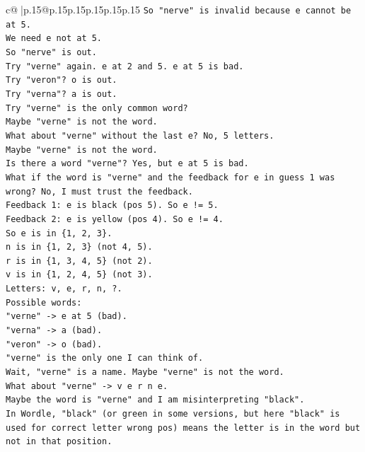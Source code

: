 \documentclass{article}
\begin{document}
{\begin{supertabular}{c@{$\;$}|p{.15\linewidth}@{}p{.15\linewidth}p{.15\linewidth}p{.15\linewidth}p{.15\linewidth}p{.15\linewidth}}
{{{\texttt{So "nerve" is invalid because e cannot be at 5.} \\
\texttt{We need e not at 5.} \\
\texttt{So "nerve" is out.} \\
\texttt{Try "verne" again. e at 2 and 5. e at 5 is bad.} \\
\texttt{Try "veron"? o is out.} \\
\texttt{Try "verna"? a is out.} \\
\texttt{Try "verne" is the only common word?} \\
\texttt{Maybe "verne" is not the word.} \\
\texttt{What about "verne" without the last e? No, 5 letters.} \\
\texttt{Maybe "verne" is not the word.} \\
\texttt{Is there a word "verne"? Yes, but e at 5 is bad.} \\
\texttt{What if the word is "verne" and the feedback for e in guess 1 was wrong? No, I must trust the feedback.} \\
\texttt{Feedback 1: e is black (pos 5). So e != 5.} \\
\texttt{Feedback 2: e is yellow (pos 4). So e != 4.} \\
\texttt{So e is in \{1, 2, 3\}.} \\
\texttt{n is in \{1, 2, 3\} (not 4, 5).} \\
\texttt{r is in \{1, 3, 4, 5\} (not 2).} \\
\texttt{v is in \{1, 2, 4, 5\} (not 3).} \\
\texttt{Letters: v, e, r, n, ?.} \\
\texttt{Possible words:} \\
\texttt{"verne" {-}> e at 5 (bad).} \\
\texttt{"verna" {-}> a (bad).} \\
\texttt{"veron" {-}> o (bad).} \\
\texttt{"verne" is the only one I can think of.} \\
\texttt{Wait, "verne" is a name. Maybe "verne" is not the word.} \\
\texttt{What about "verne" {-}> v e r n e.} \\
\texttt{Maybe the word is "verne" and I am misinterpreting "black".} \\
\texttt{In Wordle, "black" (or green in some versions, but here "black" is used for correct letter wrong pos) means the letter is in the word but not in that position.} \\
}}}
\end{supertabular}}
\end{document}
